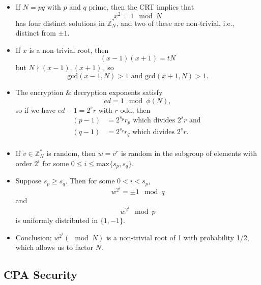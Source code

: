 \documentclass[a4paper]{scrartcl}
\begin{document}
\begin{itemize}
\item If $N = pq$ with $p$ and $q$ prime, then the CRT implies that $$x^2 = 1 \mod N$$ has four distinct solutions in $\mathbb{Z}_N^*$, and two of these are non-trivial, i.e., distinct from $\pm 1$.
\item If $x$ is a non-trivial root, then $$(x-1)(x+1) = tN$$ but $N \nmid (x-1), (x+1),$ so $$\text{gcd}(x-1,N) > 1 \text{ \ and \ } \text{gcd}(x+1,N) > 1 .$$
\item The encryption \& decryption exponents satisfy $$ed = 1 \mod \phi(N),$$ so if we have $ed - 1 = 2^sr$ with $r$ odd, then
\begin{align*}
(p-1) &= 2^{s_p}r_p \text{ \ which divides \ } 2^sr \text{ \ and \ }\\ 
(q-1) &= 2^{s_q}r_q \text{ \ which divides \ } 2^sr .\\ 
\end{align*}
\item If $v \in \mathbb{Z}_N^*$ is random, then $w = v^r$ is random in the subgroup of elements with order $2^i$ for some $0 \leq i \leq \text{max}\{s_p,s_q\}.$
\item Suppose $s_p \geq s_q$. Then for some $0<i<s_p$, $$w^{2^i} = \pm 1 \mod q$$ and $$w^{2^i} \mod p$$ is uniformly distributed in $\{1,-1\}$.
\item Conclusion: $w^{2^i} (\mod N)$ is a non-trivial root of 1 with probability 1/2, which allows us to factor $N$.
\end{itemize}

\subsection*{CPA Security}
\end{document}
